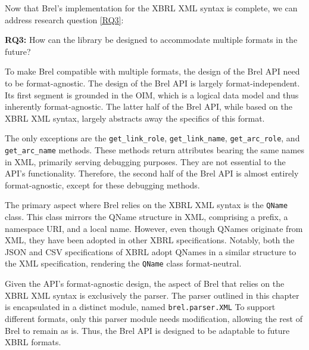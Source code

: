 Now that Brel's implementation for the XBRL XML syntax is complete, we can address research question \ref{RQ3}:

\begin{displayquote}
    \textbf{RQ3:} How can the library be designed to accommodate multiple formats in the future?
\end{displayquote}

To make Brel compatible with multiple formats, the design of the Brel API need to be format-agnostic. 
The design of the Brel API is largely format-independent. 
Its first segment is grounded in the OIM, which is a logical data model and thus inherently format-agnostic.
The latter half of the Brel API, while based on the XBRL XML syntax, largely abstracts away the specifics of this format. 

The only exceptions are the \texttt{get\_link\_role}, \texttt{get\_link\_name}, \texttt{get\_arc\_role}, and \texttt{get\_arc\_name} methods.
These methods return attributes bearing the same names in XML, primarily serving debugging purposes.
They are not essential to the API's functionality.
Therefore, the second half of the Brel API is almost entirely format-agnostic, 
except for these debugging methods.

The primary aspect where Brel relies on the XBRL XML syntax is the \texttt{QName} class.
This class mirrors the QName structure in XML, comprising a prefix, a namespace URI, and a local name. 
However, even though QNames originate from XML, they have been adopted in other XBRL specifications.
Notably, both the JSON\cite{xbrl_json} and CSV\cite{xbrl_csv} specifications of XBRL adopt QNames in a similar structure to the XML specification, 
rendering the \texttt{QName} class format-neutral.

Given the API's format-agnostic design, the aspect of Brel that relies on the XBRL XML syntax is exclusively the parser. 
The parser outlined in this chapter is encapsulated in a distinct module, named \texttt{brel.parser.XML}
To support different formats, only this parser module needs modification, allowing the rest of Brel to remain as is.
Thus, the Brel API is designed to be adaptable to future XBRL formats.
